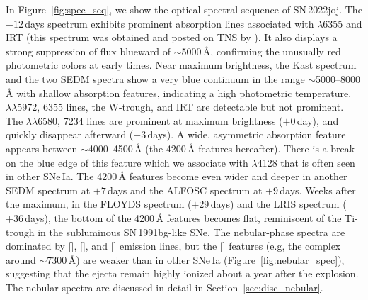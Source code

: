 \documentclass[twocolumn]{aastex631}
\newcommand{\sn}{SN\,2022joj}
\begin{document}
\begin{CJK*}{UTF8}{gbsn}
In Figure~\ref{fig:spec_seq}, we show the optical spectral sequence of \sn. The $-12$\,days spectrum exhibits prominent absorption lines associated with  $\lambda$6355 and  IRT (this spectrum was obtained and posted on TNS by \citealt{Newsome_2022TNSCR}). It also displays a strong suppression of flux blueward of $\sim$5000\,\r{A}, confirming the unusually red photometric colors at early times. Near maximum brightness, the Kast spectrum and the two SEDM spectra show a very blue continuum in the range $\sim$5000--8000\,\r{A} with shallow absorption features, indicating a high photometric temperature.  $\lambda\lambda$5972, 6355 lines, the  W-trough, and  IRT are detectable but not prominent. The  $\lambda\lambda$6580, 7234 lines are prominent at maximum brightness ($+0$\,day), and quickly disappear afterward ($+3$\,days). A wide, asymmetric absorption feature appears between $\sim$4000--4500\,\r{A} (the 4200\,\r{A} features hereafter). There is a break on the blue edge of this feature which we associate with  $\lambda$4128 that is often seen in other SNe\,Ia. %
The 4200\,\r{A} features become even wider and deeper in another SEDM spectrum at $+7$\,days and the ALFOSC spectrum at $+9$\,days. Weeks after the maximum, in the FLOYDS spectrum ($+29$\,days) and the LRIS spectrum ($+36$\,days), the bottom of the 4200\,\r{A} features becomes flat, reminiscent of the Ti-trough in the subluminous SN\,1991bg-like \citep[91bg-like;][]{Filippenko_91bg_1992,Leibundgut_91bg_1993} SNe. The nebular-phase spectra are dominated by [], [], and [] emission lines, but the [] features (e.g, the complex around $\sim$7300\,\r{A}) are weaker than in other SNe\,Ia (Figure~\ref{fig:nebular_spec}), suggesting that the ejecta remain highly ionized about a year after the explosion. The nebular spectra are discussed in detail in Section~\ref{sec:disc_nebular}.


\end{CJK*}
\end{document}
